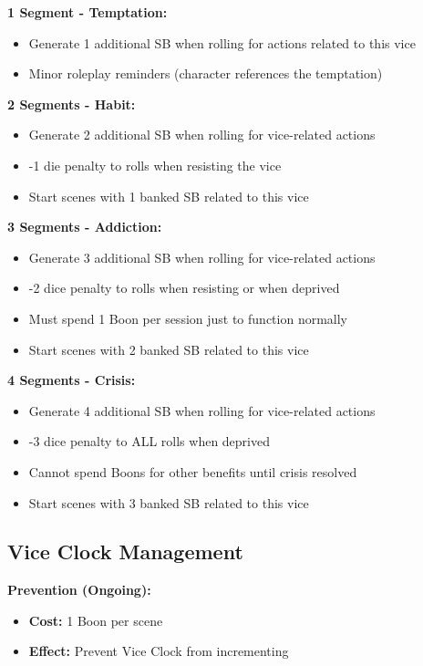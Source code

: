 \documentclass[11pt]{article}
\begin{document}
\textbf{1 Segment - Temptation:}
\begin{itemize}
    \item Generate 1 additional SB when rolling for actions related to this vice
    \item Minor roleplay reminders (character references the temptation)
\end{itemize}

\textbf{2 Segments - Habit:}
\begin{itemize}
    \item Generate 2 additional SB when rolling for vice-related actions
    \item -1 die penalty to rolls when resisting the vice
    \item Start scenes with 1 banked SB related to this vice
\end{itemize}

\textbf{3 Segments - Addiction:}
\begin{itemize}
    \item Generate 3 additional SB when rolling for vice-related actions
    \item -2 dice penalty to rolls when resisting or when deprived
    \item Must spend 1 Boon per session just to function normally
    \item Start scenes with 2 banked SB related to this vice
\end{itemize}

\textbf{4 Segments - Crisis:}
\begin{itemize}
    \item Generate 4 additional SB when rolling for vice-related actions
    \item -3 dice penalty to ALL rolls when deprived
    \item Cannot spend Boons for other benefits until crisis resolved
    \item Start scenes with 3 banked SB related to this vice
\end{itemize}

\subsection{Vice Clock Management}

\textbf{Prevention (Ongoing):}
\begin{itemize}
    \item \textbf{Cost:} 1 Boon per scene
    \item \textbf{Effect:} Prevent Vice Clock from incrementing
\end{itemize}
\end{document}
